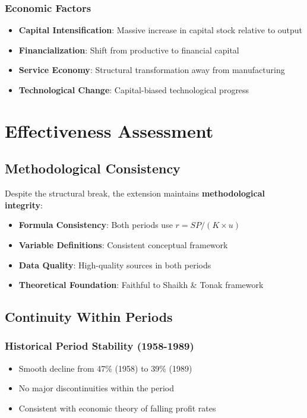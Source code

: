 \documentclass[12pt]{article}
\begin{document}
\subsubsection{Economic Factors}
\begin{itemize}
    \item \textbf{Capital Intensification}: Massive increase in capital stock relative to output
    \item \textbf{Financialization}: Shift from productive to financial capital
    \item \textbf{Service Economy}: Structural transformation away from manufacturing
    \item \textbf{Technological Change}: Capital-biased technological progress
\end{itemize}

\section{Effectiveness Assessment}

\subsection{Methodological Consistency}

\begin{tcolorbox}[colback=green!5!white,colframe=green!75!black,title=Methodological Validation]
Despite the structural break, the extension maintains \textbf{methodological integrity}:

\begin{itemize}
    \item \textbf{Formula Consistency}: Both periods use $r = SP/(K \times u)$
    \item \textbf{Variable Definitions}: Consistent conceptual framework
    \item \textbf{Data Quality}: High-quality sources in both periods
    \item \textbf{Theoretical Foundation}: Faithful to Shaikh \& Tonak framework
\end{itemize}
\end{tcolorbox}

\subsection{Continuity Within Periods}

\subsubsection{Historical Period Stability (1958-1989)}
\begin{itemize}
    \item Smooth decline from 47\% (1958) to 39\% (1989)
    \item No major discontinuities within the period
    \item Consistent with economic theory of falling profit rates
\end{itemize}
\end{document}
